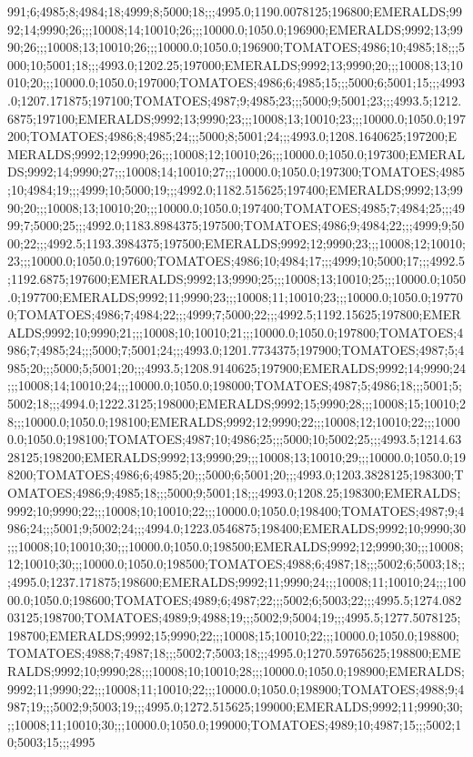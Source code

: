 991;6;4985;8;4984;18;4999;8;5000;18;;;4995.0;1190.0078125;196800;EMERALDS;9992;14;9990;26;;;10008;14;10010;26;;;10000.0;1050.0;196900;EMERALDS;9992;13;9990;26;;;10008;13;10010;26;;;10000.0;1050.0;196900;TOMATOES;4986;10;4985;18;;;5000;10;5001;18;;;4993.0;1202.25;197000;EMERALDS;9992;13;9990;20;;;10008;13;10010;20;;;10000.0;1050.0;197000;TOMATOES;4986;6;4985;15;;;5000;6;5001;15;;;4993.0;1207.171875;197100;TOMATOES;4987;9;4985;23;;;5000;9;5001;23;;;4993.5;1212.6875;197100;EMERALDS;9992;13;9990;23;;;10008;13;10010;23;;;10000.0;1050.0;197200;TOMATOES;4986;8;4985;24;;;5000;8;5001;24;;;4993.0;1208.1640625;197200;EMERALDS;9992;12;9990;26;;;10008;12;10010;26;;;10000.0;1050.0;197300;EMERALDS;9992;14;9990;27;;;10008;14;10010;27;;;10000.0;1050.0;197300;TOMATOES;4985;10;4984;19;;;4999;10;5000;19;;;4992.0;1182.515625;197400;EMERALDS;9992;13;9990;20;;;10008;13;10010;20;;;10000.0;1050.0;197400;TOMATOES;4985;7;4984;25;;;4999;7;5000;25;;;4992.0;1183.8984375;197500;TOMATOES;4986;9;4984;22;;;4999;9;5000;22;;;4992.5;1193.3984375;197500;EMERALDS;9992;12;9990;23;;;10008;12;10010;23;;;10000.0;1050.0;197600;TOMATOES;4986;10;4984;17;;;4999;10;5000;17;;;4992.5;1192.6875;197600;EMERALDS;9992;13;9990;25;;;10008;13;10010;25;;;10000.0;1050.0;197700;EMERALDS;9992;11;9990;23;;;10008;11;10010;23;;;10000.0;1050.0;197700;TOMATOES;4986;7;4984;22;;;4999;7;5000;22;;;4992.5;1192.15625;197800;EMERALDS;9992;10;9990;21;;;10008;10;10010;21;;;10000.0;1050.0;197800;TOMATOES;4986;7;4985;24;;;5000;7;5001;24;;;4993.0;1201.7734375;197900;TOMATOES;4987;5;4985;20;;;5000;5;5001;20;;;4993.5;1208.9140625;197900;EMERALDS;9992;14;9990;24;;;10008;14;10010;24;;;10000.0;1050.0;198000;TOMATOES;4987;5;4986;18;;;5001;5;5002;18;;;4994.0;1222.3125;198000;EMERALDS;9992;15;9990;28;;;10008;15;10010;28;;;10000.0;1050.0;198100;EMERALDS;9992;12;9990;22;;;10008;12;10010;22;;;10000.0;1050.0;198100;TOMATOES;4987;10;4986;25;;;5000;10;5002;25;;;4993.5;1214.6328125;198200;EMERALDS;9992;13;9990;29;;;10008;13;10010;29;;;10000.0;1050.0;198200;TOMATOES;4986;6;4985;20;;;5000;6;5001;20;;;4993.0;1203.3828125;198300;TOMATOES;4986;9;4985;18;;;5000;9;5001;18;;;4993.0;1208.25;198300;EMERALDS;9992;10;9990;22;;;10008;10;10010;22;;;10000.0;1050.0;198400;TOMATOES;4987;9;4986;24;;;5001;9;5002;24;;;4994.0;1223.0546875;198400;EMERALDS;9992;10;9990;30;;;10008;10;10010;30;;;10000.0;1050.0;198500;EMERALDS;9992;12;9990;30;;;10008;12;10010;30;;;10000.0;1050.0;198500;TOMATOES;4988;6;4987;18;;;5002;6;5003;18;;;4995.0;1237.171875;198600;EMERALDS;9992;11;9990;24;;;10008;11;10010;24;;;10000.0;1050.0;198600;TOMATOES;4989;6;4987;22;;;5002;6;5003;22;;;4995.5;1274.08203125;198700;TOMATOES;4989;9;4988;19;;;5002;9;5004;19;;;4995.5;1277.5078125;198700;EMERALDS;9992;15;9990;22;;;10008;15;10010;22;;;10000.0;1050.0;198800;TOMATOES;4988;7;4987;18;;;5002;7;5003;18;;;4995.0;1270.59765625;198800;EMERALDS;9992;10;9990;28;;;10008;10;10010;28;;;10000.0;1050.0;198900;EMERALDS;9992;11;9990;22;;;10008;11;10010;22;;;10000.0;1050.0;198900;TOMATOES;4988;9;4987;19;;;5002;9;5003;19;;;4995.0;1272.515625;199000;EMERALDS;9992;11;9990;30;;;10008;11;10010;30;;;10000.0;1050.0;199000;TOMATOES;4989;10;4987;15;;;5002;10;5003;15;;;4995
